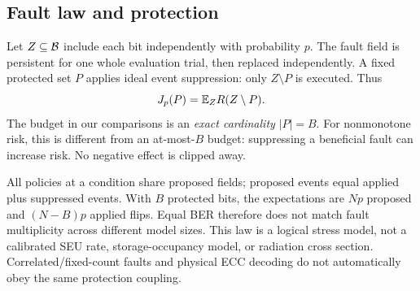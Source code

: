 \subsection{Fault law and protection}
Let $Z\subseteq\mathcal B$ include each bit independently with probability $p$. The fault field is persistent for one whole evaluation trial, then replaced independently. A fixed protected set $P$ applies ideal event suppression: only $Z\setminus P$ is executed. Thus
\begin{equation}\label{eq:expected-risk}
J_p(P)=\mathbb{E}_Z R(Z\setminus P).
\end{equation}
The budget in our comparisons is an \emph{exact cardinality} $|P|=B$. For nonmonotone risk, this is different from an at-most-$B$ budget: suppressing a beneficial fault can increase risk. No negative effect is clipped away.

All policies at a condition share proposed fields; proposed events equal applied plus suppressed events. With $B$ protected bits, the expectations are $Np$ proposed and $(N-B)p$ applied flips. Equal BER therefore does not match fault multiplicity across different model sizes. This law is a logical stress model, not a calibrated SEU rate, storage-occupancy model, or radiation cross section. Correlated/fixed-count faults and physical ECC decoding do not automatically obey the same protection coupling.

